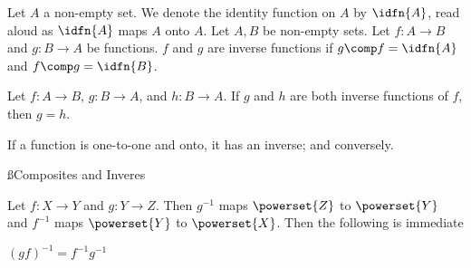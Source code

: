 Let $A$ a non-empty set.
We denote the identity
function on $A$ by $\idfn{A}$,
read aloud as
$\idfn{A}$ maps $A$ onto $A$.
Let $A, B$ be non-empty sets.
Let $f: A \to B$ and $g: B \to A$
be functions.
$f$ and $g$ are inverse functions
if $g \comp f = \idfn{A}$
and $f \comp g = \idfn{B}$.



\begin{proposition}[Uniqueness]
  Let $f: A \to B$,
  $g: B \to A$,
  and $h: B \to A$.
  If $g$ and $h$
  are both inverse
  functions of $f$,
  then $g = h$.
\end{proposition}

\begin{proposition}[Existence]
  If a function is one-to-one and onto, it has an inverse; and conversely.
\end{proposition}

\ss{Composites and Inveres}

Let $f: X \to Y$ and $g: Y \to Z$.
Then $g^{-1}$ maps $\powerset{Z}$ to $\powerset{Y}$ and $f^{-1}$ maps $\powerset{Y}$ to $\powerset{X}$.
Then the following is immediate
{\small
\begin{proposition}
  $(gf)^{-1} = f^{-1}g^{-1}$
\end{proposition}
}

%

%
